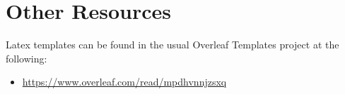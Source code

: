 \section{Other Resources}

Latex templates can be found in the usual Overleaf Templates project at the following:

\begin{itemize}
    \item \href{https://www.overleaf.com/read/mpdhvnnjzsxq}{https://www.overleaf.com/read/mpdhvnnjzsxq}
\end{itemize}